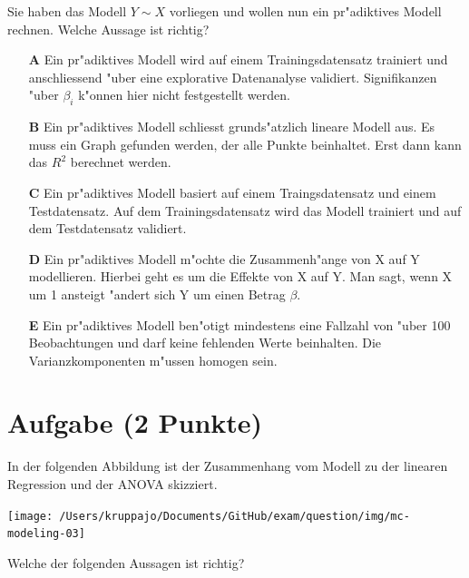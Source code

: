 \documentclass[a4paper, 10pt]{scrartcl}\usepackage[]{graphicx}\usepackage[]{xcolor}
\begin{document}
Sie haben das Modell $Y \sim X$ vorliegen und wollen nun ein
pr{"a}diktives Modell rechnen. Welche Aussage ist richtig?



\begin{enumerate}
\item [\textbf{A} \msquare] Ein pr{"a}diktives Modell wird auf einem Trainingsdatensatz trainiert und anschliessend {"u}ber eine explorative Datenanalyse validiert. Signifikanzen {"u}ber $\beta_i$ k{"o}nnen hier nicht festgestellt werden.
\item [\textbf{B} \msquare] Ein pr{"a}diktives Modell schliesst grunds{"a}tzlich lineare Modell aus. Es muss ein Graph gefunden werden, der alle Punkte beinhaltet. Erst dann kann das $R^2$ berechnet werden.
\item [\textbf{C} \msquare] Ein pr{"a}diktives Modell basiert auf einem Traingsdatensatz und einem Testdatensatz. Auf dem Trainingsdatensatz wird das Modell trainiert und auf dem Testdatensatz validiert.
\item [\textbf{D} \msquare] Ein pr{"a}diktives Modell m{"o}chte die Zusammenh{"a}nge von X auf Y modellieren. Hierbei geht es um die Effekte von X auf Y. Man sagt, wenn X um 1 ansteigt {"a}ndert sich Y um einen Betrag $\beta$.
\item [\textbf{E} \msquare] Ein pr{"a}diktives Modell ben{"o}tigt mindestens eine Fallzahl von {"u}ber 100 Beobachtungen und darf keine fehlenden Werte beinhalten. Die Varianzkomponenten m{"u}ssen homogen sein.
\end{enumerate}

\section{Aufgabe \hfill (2 Punkte)}



In der folgenden Abbildung ist der Zusammenhang vom Modell zu der linearen
Regression und der ANOVA skizziert.

\begin{center}
  \texttt{[image: /Users/kruppajo/Documents/GitHub/exam/question/img/mc-modeling-03]}
\end{center}

Welche der folgenden Aussagen ist richtig?
\end{document}

